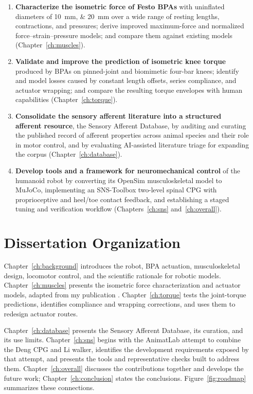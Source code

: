 \begin{enumerate}
    \item \textbf{Characterize the isometric force of Festo BPAs} with uninflated diameters of \qtylist{10;20}{\mm} over a wide range of resting lengths, contractions, and pressures; derive improved maximum-force and normalized force--strain--pressure models; and compare them against existing models (Chapter~\ref{ch:muscles}).
    \item \textbf{Validate and improve the prediction of isometric knee torque} produced by BPAs on pinned-joint and biomimetic four-bar knees; identify and model losses caused by constant length offsets, series compliance, and actuator wrapping; and compare the resulting torque envelopes with human capabilities (Chapter~\ref{ch:torque}).
    \item \textbf{Consolidate the sensory afferent literature into a structured afferent resource}, the Sensory Afferent Database, by auditing and curating the published record of afferent properties across animal species and their role in motor control, and by evaluating AI-assisted literature triage for expanding the corpus (Chapter~\ref{ch:database}).
    \item \textbf{Develop tools and a framework for neuromechanical control} of the humanoid robot by converting its OpenSim musculoskeletal model to MuJoCo, implementing an SNS-Toolbox two-level spinal CPG with proprioceptive and heel/toe contact feedback, and establishing a staged tuning and verification workflow (Chapters~\ref{ch:sns} and~\ref{ch:overall}).
\end{enumerate}

\section{Dissertation Organization}\label{sec:organization}

Chapter~\ref{ch:background} introduces the robot, BPA actuation, musculoskeletal design, locomotor control, and the scientific rationale for robotic models. Chapter~\ref{ch:muscles} presents the isometric force characterization and actuator models, adapted from my publication \citep{bolen_2026}. Chapter~\ref{ch:torque} tests the joint-torque predictions, identifies compliance and wrapping corrections, and uses them to redesign actuator routes.

Chapter~\ref{ch:database} presents the Sensory Afferent Database, its curation, and its use limits. Chapter~\ref{ch:sns} begins with the AnimatLab attempt to combine the Deng CPG and Li walker, identifies the development requirements exposed by that attempt, and presents the tools and representative checks built to address them. Chapter~\ref{ch:overall} discusses the contributions together and develops the future work; Chapter~\ref{ch:conclusion} states the conclusions. Figure~\ref{fig:roadmap} summarizes these connections.

